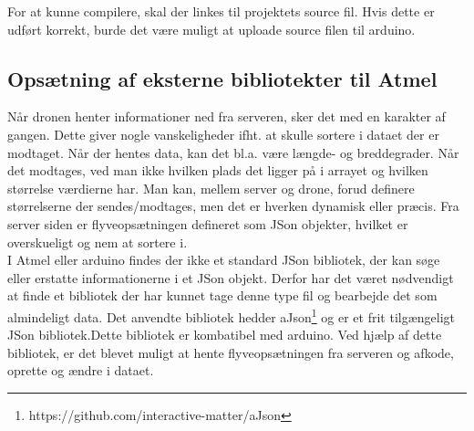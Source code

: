 For at kunne compilere, skal der linkes til projektets source fil. Hvis dette er udført korrekt, burde det være muligt at uploade source filen til arduino.

\subsection{Opsætning af eksterne bibliotekter til Atmel}

Når dronen henter informationer ned fra serveren, sker det med en karakter af gangen. Dette giver nogle vanskeligheder ifht. at skulle sortere i dataet der er modtaget. Når der hentes data, kan det bl.a. være længde- og breddegrader. Når det modtages, ved man ikke hvilken plads det ligger på i arrayet og hvilken størrelse værdierne har. Man kan, mellem server og drone, forud definere størrelserne der sendes/modtages, men det er hverken dynamisk eller præcis. Fra server siden er flyveopsætningen defineret som JSon objekter, hvilket er overskueligt og nem at sortere i. \\
I Atmel eller arduino findes der ikke et standard JSon bibliotek, der kan søge eller erstatte informationerne i et JSon objekt. Derfor har det været nødvendigt at finde et bibliotek der har kunnet tage denne type fil og bearbejde det som almindeligt data. Det anvendte bibliotek hedder aJson\footnote{https://github.com/interactive-matter/aJson} og er et frit tilgængeligt JSon bibliotek.Dette bibliotek er kombatibel med arduino. Ved hjælp af dette bibliotek, er det blevet muligt at hente flyveopsætningen fra serveren og afkode, oprette og ændre i dataet.